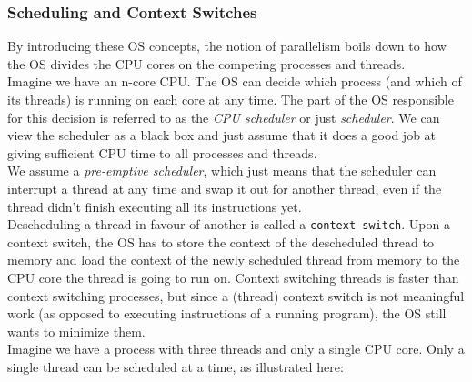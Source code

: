 \documentclass[main]{subfiles}
\begin{document}
\subsubsection{Scheduling and Context Switches}
By introducing these OS concepts, the notion of parallelism boils down to how the OS divides the CPU cores on the competing processes and threads. \\
Imagine we have an n-core CPU. The OS can decide which process (and which of its threads) is running on each core at any time. The part of the OS responsible for this decision is referred to as the \textit{CPU scheduler} or just \textit{scheduler}. We can view the scheduler as a black box and just assume that it does a good job at giving sufficient CPU time to all processes and threads.\\
We assume a \textit{pre-emptive scheduler}, which just means that the scheduler can interrupt a thread at any time and swap it out for another thread, even if the thread didn't finish executing all its instructions yet.\\[3mm]
Descheduling a thread in favour of another is called a \texttt{context switch}. Upon a context switch, the OS has to store the context of the descheduled thread to memory and load the context of the newly scheduled thread from memory to the CPU core the thread is going to run on. Context switching threads is faster than context switching processes, but since a (thread) context switch is not meaningful work (as opposed to executing instructions of a running program), the OS still wants to minimize them.\\[3mm]
Imagine we have a process with three threads and only a single CPU core. Only a single thread can be scheduled at a time, as illustrated here:
\end{document}

